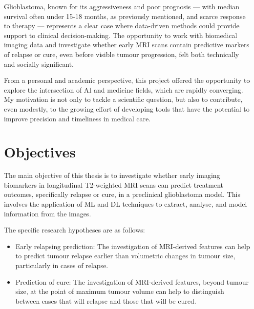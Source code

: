 \documentclass[12pt, a4paper]{report}
\begin{document}
Glioblastoma, known for its aggressiveness and poor prognosis — with median survival often under 15-18 months, as previously mentioned, and scarce response to therapy — represents a clear case where data-driven methods could provide support to clinical decision-making. The opportunity to work with biomedical imaging data and investigate whether early MRI scans contain predictive markers of relapse or cure, even before visible tumour progression, felt both technically and socially significant.

From a personal and academic perspective, this project offered the opportunity to explore the intersection of AI and medicine fields, which are rapidly converging. My motivation is not only to tackle a scientific question, but also to contribute, even modestly, to the growing effort of developing tools that have the potential to improve precision and timeliness in medical care.

\section{Objectives}

The main objective of this thesis is to investigate whether early imaging biomarkers in longitudinal T2-weighted MRI scans can predict treatment outcomes, specifically relapse or cure, in a preclinical glioblastoma model. This involves the application of ML and DL techniques to extract, analyse, and model information from the images.

The specific research hypotheses are as follows:

\begin{itemize}
    \item Early relapsing prediction: The investigation of MRI-derived features can help to predict tumour relapse earlier than volumetric changes in tumour size, particularly in cases of relapse.
    \item Prediction of cure: The investigation of MRI-derived features, beyond tumour size, at the point of maximum tumour volume can help to distinguish between cases that will relapse and those that will be cured.
\end{itemize}
\end{document}
